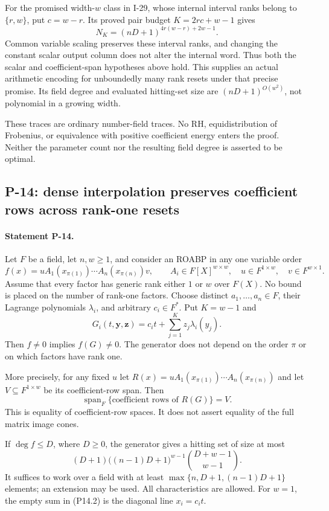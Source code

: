 For the promised width-$w$ class in I-29, whose internal interval
ranks belong to $\{r,w\}$, put $c=w-r$. Its proved pair budget
$K=2rc+w-1$ gives
\[
 N_K=(nD+1)^{4r(w-r)+2w-1}.
\]
Common variable scaling preserves these interval ranks, and
changing the constant scalar output column does not alter the
internal word. Thus both the scalar and coefficient-span
hypotheses above hold. This supplies an actual arithmetic
encoding for unboundedly many rank resets under that precise
promise. Its field degree and evaluated hitting-set size are
$(nD+1)^{O(w^2)}$, not polynomial in a growing width.

These traces are ordinary number-field traces. No RH,
equidistribution of Frobenius, or equivalence with positive coefficient
energy enters the proof. Neither the parameter count nor
the resulting field degree is asserted to be optimal.


\subsection{P-14: dense interpolation preserves coefficient rows across rank-one resets}
\paragraph{Statement P-14.}
Let $F$ be a field, let $n,w\geq1$, and consider an ROABP in any
one variable order
\[
 f(x)=uA_1(x_{\pi(1)})\cdots A_n(x_{\pi(n)})v,
 \qquad A_i\in F[X]^{w\times w},\quad
 u\in F^{1\times w},\quad v\in F^{w\times1}.
 \tag{P14.1}
\]
Assume that every factor has generic rank either $1$ or $w$ over
$F(X)$. No bound is placed on the number of rank-one factors.
Choose distinct $a_1,\ldots,a_n\in F$, their Lagrange polynomials
$\lambda_i$, and arbitrary $c_i\in F^*$. Put $K=w-1$ and
\[
 G_i(t,\mathbf y,\mathbf z)
       =c_it+\sum_{j=1}^{K}z_j\lambda_i(y_j).
 \tag{P14.2}
\]
Then $f\ne0$ implies $f(G)\ne0$. The generator does not depend
on the order $\pi$ or on which factors have rank one.

More precisely, for any fixed $u$ let
$R(x)=uA_1(x_{\pi(1)})\cdots A_n(x_{\pi(n)})$ and let
$V\subseteq F^{1\times w}$ be its coefficient-row span. Then
\[
 \operatorname{span}_F\{\text{coefficient rows of }R(G)\}=V.
 \tag{P14.3}
\]
This is equality of coefficient-row spaces. It does not assert
equality of the full matrix image cones.

If $\deg f\leq D$, where $D\geq0$, the generator gives a hitting
set of size at most
\[
 (D+1)\bigl((n-1)D+1\bigr)^{w-1}
             \binom{D+w-1}{w-1}.
 \tag{P14.4}
\]
It suffices to work over a field with at least
$\max\{n,D+1,(n-1)D+1\}$ elements; an extension may be used.
All characteristics are allowed. For $w=1$, the empty sum in
(P14.2) is the diagonal line $x_i=c_it$.

